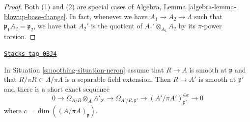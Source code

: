 \begin{proof}
Both (1) and (2) are special cases of
Algebra, Lemma \ref{algebra-lemma-blowup-base-change}.
In fact, whenever we have $A_1 \to A_2 \to \Lambda$ such that
$\mathfrak p_1 A_2 = \mathfrak p_2$, we have that $A_2'$ is
the quotient of $A_1' \otimes_{A_1} A_2$ by its $\pi$-power torsion.
\end{proof}

\begin{lemma}
\label{smoothing-lemma-neron-blowup-smooth}
\href{https://stacks.math.columbia.edu/tag/0BJ4}{\texttt{Stacks tag 0BJ4}}

In Situation \ref{smoothing-situation-neron} assume that $R \to A$ is smooth
at $\mathfrak p$ and that $R/\pi R \subset \Lambda/\pi \Lambda$
is a separable field extension. Then $R \to A'$ is smooth at
$\mathfrak p'$ and there is a short exact sequence
$$
0 \to
\Omega_{A/R} \otimes_A A'_{\mathfrak p'} \to
\Omega_{A'/R, \mathfrak p'} \to
(A'/\pi A')_{\mathfrak p'}^{\oplus c} \to 0
$$
where $c = \dim((A/\pi A)_\mathfrak p)$.
\end{lemma}


